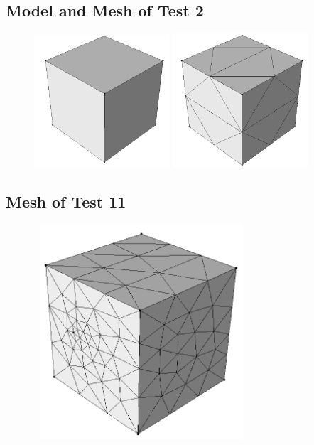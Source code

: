 \documentclass[a4paper, 12pt]{article}
\begin{document}
\subsection{Model and Mesh of Test 2} \label{subsec:test2Img}
\begin{figure}[H]
  \centering
  \subfigure
    { \includegraphics[width=0.45\textwidth, height=0.45\textwidth]{test2_smd}}
  \subfigure
    { \includegraphics[width=0.45\textwidth, height=0.45\textwidth]{test2_sms}}
\end{figure}

\subsection{Mesh of Test 11} \label{subsec:test11Img}
\begin{figure}[H]
  \centering
  \includegraphics[width=8cm, height=8cm]{test11_sms}
\end{figure}
\end{document}
